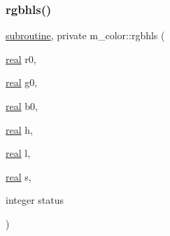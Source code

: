 \begin{DoxyDescription}
\end{DoxyDescription}\mbox{\label{namespacem__color_a1dd027cbe65112af243d26195b1fc49a}} 
\subsubsection{\texorpdfstring{rgbhls()}{rgbhls()}}
{\footnotesize\ttfamily \hyperlink{M__stopwatch_83_8txt_acfbcff50169d691ff02d4a123ed70482}{subroutine}, private m\+\_\+color\+::rgbhls (\begin{DoxyParamCaption}\item[{\hyperlink{read__watch_83_8txt_abdb62bde002f38ef75f810d3a905a823}{real}}]{r0,  }\item[{\hyperlink{read__watch_83_8txt_abdb62bde002f38ef75f810d3a905a823}{real}}]{g0,  }\item[{\hyperlink{read__watch_83_8txt_abdb62bde002f38ef75f810d3a905a823}{real}}]{b0,  }\item[{\hyperlink{read__watch_83_8txt_abdb62bde002f38ef75f810d3a905a823}{real}}]{h,  }\item[{\hyperlink{read__watch_83_8txt_abdb62bde002f38ef75f810d3a905a823}{real}}]{l,  }\item[{\hyperlink{read__watch_83_8txt_abdb62bde002f38ef75f810d3a905a823}{real}}]{s,  }\item[{integer}]{status }\end{DoxyParamCaption})\hspace{0.3cm}{\ttfamily [private]}}



